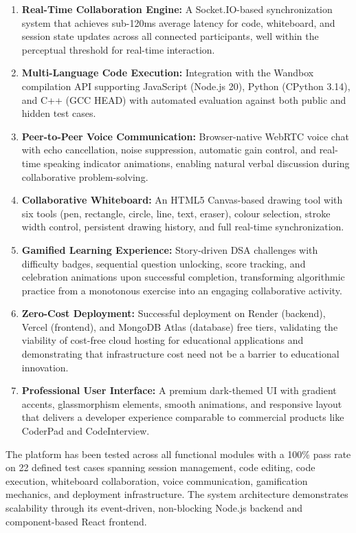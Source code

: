 \begin{enumerate}[label=\arabic*.]
    \item \textbf{Real-Time Collaboration Engine:} A Socket.IO-based synchronization system that achieves sub-120ms average latency for code, whiteboard, and session state updates across all connected participants, well within the perceptual threshold for real-time interaction.
    \item \textbf{Multi-Language Code Execution:} Integration with the Wandbox compilation API supporting JavaScript (Node.js 20), Python (CPython 3.14), and C++ (GCC HEAD) with automated evaluation against both public and hidden test cases.
    \item \textbf{Peer-to-Peer Voice Communication:} Browser-native WebRTC voice chat with echo cancellation, noise suppression, automatic gain control, and real-time speaking indicator animations, enabling natural verbal discussion during collaborative problem-solving.
    \item \textbf{Collaborative Whiteboard:} An HTML5 Canvas-based drawing tool with six tools (pen, rectangle, circle, line, text, eraser), colour selection, stroke width control, persistent drawing history, and full real-time synchronization.
    \item \textbf{Gamified Learning Experience:} Story-driven DSA challenges with difficulty badges, sequential question unlocking, score tracking, and celebration animations upon successful completion, transforming algorithmic practice from a monotonous exercise into an engaging collaborative activity.
    \item \textbf{Zero-Cost Deployment:} Successful deployment on Render (backend), Vercel (frontend), and MongoDB Atlas (database) free tiers, validating the viability of cost-free cloud hosting for educational applications and demonstrating that infrastructure cost need not be a barrier to educational innovation.
    \item \textbf{Professional User Interface:} A premium dark-themed UI with gradient accents, glassmorphism elements, smooth animations, and responsive layout that delivers a developer experience comparable to commercial products like CoderPad and CodeInterview.
\end{enumerate}

The platform has been tested across all functional modules with a 100\% pass rate on 22 defined test cases spanning session management, code editing, code execution, whiteboard collaboration, voice communication, gamification mechanics, and deployment infrastructure. The system architecture demonstrates scalability through its event-driven, non-blocking Node.js backend and component-based React frontend.

